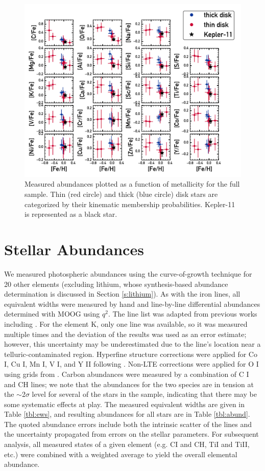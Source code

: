 \documentclass[twocolumn]{aastex61}
\begin{document}
\begin{figure}
\centering
\includegraphics[scale=0.7]{xh}
\caption{Measured abundances plotted as a function of metallicity for the full sample. Thin (red circle) and thick (blue circle) disk stars are categorized by their kinematic membership probabilities. Kepler-11 is represented as a black star.}
\label{fig:xh}
\end{figure}

\section{Stellar Abundances}
\label{s:abundances}

We measured photospheric abundances using the curve-of-growth technique for 20 other elements (excluding lithium, whose synthesis-based abundance determination is discussed in Section \ref{s:lithium}). As with the iron lines, all equivalent widths were measured by hand and line-by-line differential abundances determined with MOOG using $q^2$. The line list was adapted from previous works including \citet{Bedell2014}. For the element K, only one line was available, so it was measured multiple times and the deviation of the results was used as an error estimate; however, this uncertainty may be underestimated due to the line's location near a telluric-contaminated region. Hyperfine structure corrections were applied for Co I, Cu I, Mn I, V I, and Y II following \citet{Melendez2012}. Non-LTE corrections were applied for O I using grids from \citet{Ramirez2007}. Carbon abundances were measured by a combination of C I and CH lines; we note that the abundances for the two species are in tension at the $\sim$2$\sigma$ level for several of the stars in the sample, indicating that there may be some systematic effects at play. The measured equivalent widths are given in Table \ref{tbl:ews}, and resulting abundances for all stars are in Table \ref{tbl:abund}.  The quoted abundance errors include both the intrinsic scatter of the lines and the uncertainty propagated from errors on the stellar parameters. For subsequent analysis, all measured states of a given element (e.g. CI and CH, TiI and TiII, etc.) were combined with a weighted average to yield the overall elemental abundance.
\end{document}
